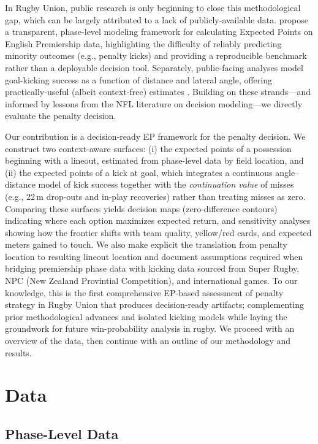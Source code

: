 \documentclass[12pt]{article}
\begin{document}
In Rugby Union, public research is only beginning to close this methodological gap, which can be largely attributed to a lack of publicly-available data. \cite{Martinez-Arastey2025} propose a transparent, phase-level modeling framework for calculating Expected Points on English Premiership data, highlighting the difficulty of reliably predicting minority outcomes (e.g., penalty kicks) and providing a reproducible benchmark rather than a deployable decision tool. Separately, public-facing analyses model goal-kicking success as a function of distance and lateral angle, offering practically-useful (albeit context-free) estimates \citep{Monpezat2023}. Building on these strands---and informed by lessons from the NFL literature on decision modeling---we directly evaluate the penalty decision.

Our contribution is a decision-ready EP framework for the penalty decision. We construct two context-aware surfaces: (i) the expected points of a possession beginning with a lineout, estimated from phase-level data by field location, and (ii) the expected points of a kick at goal, which integrates a continuous angle--distance model of kick success together with the \emph{continuation value} of misses (e.g., 22\,m drop-outs and in-play recoveries) rather than treating misses as zero. Comparing these surfaces yields decision maps (zero-difference contours) indicating where each option maximizes expected return, and sensitivity analyses showing how the frontier shifts with team quality, yellow/red cards, and expected meters gained to touch. We also make explicit the translation from penalty location to resulting lineout location and document assumptions required when bridging premiership phase data with kicking data sourced from Super Rugby, NPC (New Zealand Provintial Competition), and international games. To our knowledge, this is the first comprehensive EP-based assessment of penalty strategy in Rugby Union that produces decision-ready artifacts; complementing prior methodological advances and isolated kicking models while laying the groundwork for future win-probability analysis in rugby. We proceed with an overview of the data, then continue with an outline of our methodology and results.

\section{Data}

\subsection{Phase-Level Data}
\end{document}
